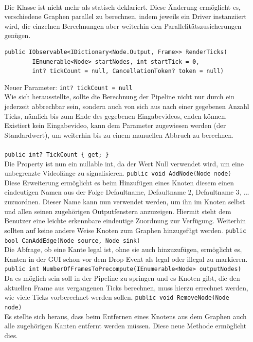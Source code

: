 \paragraph{}
\begin{itemize}
	\change Die Klasse ist nicht mehr als statisch deklariert. Diese Änderung ermöglicht es, verschiedene Graphen parallel zu berechnen, indem jeweils ein Driver instanziiert wird, die einzelnen Berechnungen aber weiterhin den Parallelitätszusicherungen genügen.
	\add \begin{verbatim}public IObservable<IDictionary<Node.Output, Frame>> RenderTicks(
	    IEnumerable<Node> startNodes, int startTick = 0,
	    int? tickCount = null, CancellationToken? token = null)
	\end{verbatim}
	Neuer Parameter: \verb!int? tickCount = null! \\ 
	Wie sich herausstellte, sollte die Berechnung der Pipeline nicht nur durch ein  jederzeit abbrechbar sein, sondern auch von sich aus nach einer gegebenen Anzahl Ticks, nämlich bis zum Ende des gegebenen Eingabevideos, enden können. Existiert kein Eingabevideo, kann dem Parameter  zugewiesen werden (der Standardwert), um weiterhin bis zu einem manuellen Abbruch zu berechnen.
\end{itemize}

\paragraph{}
\begin{itemize}
	\change \verb!public int? TickCount { get; }! \\
	Die Property ist nun ein nullable int, da der Wert Null verwendet wird, um eine unbegrenzte Videolänge zu signalisieren.
	\add \verb!public void AddNode(Node node)! \\
	Diese Erweiterung ermöglicht es beim Hinzufügen eines Knoten diesem einen eindeutigen Namen aus der Folge Defaultname, Defaultname 2, Defaultname 3, ... zuzuordnen. Dieser Name kann nun verwendet werden, um ihn im Knoten selbst und allen seinen zugehörigen Outputfenstern anzuzeigen. Hiermit steht dem Benutzer eine leichte erkennbare eindeutige Zuordnung zur Verfügung. Weiterhin sollten auf keine andere Weise Knoten zum Graphen hinzugefügt werden.
	\add \verb!public bool CanAddEdge(Node source, Node sink)! \\
	Die Abfrage, ob eine Kante legal ist, ohne sie auch hinzuzufügen, ermöglicht es, Kanten in der GUI schon vor dem Drop-Event als legal oder illegal zu markieren.
	\add \verb!public int NumberOfFramesToPrecompute(IEnumerable<Node> outputNodes)! \\
	Da es möglich sein soll in der Pipeline zu springen und es Knoten gibt, die den aktuellen Frame aus vergangenen Ticks berechnen, muss hierzu errechnet werden, wie viele Ticks vorberechnet werden sollen.
	\add \verb!public void RemoveNode(Node node)! \\
	Es stellte sich heraus, dass beim Entfernen eines Knotens aus dem Graphen auch alle zugehörigen Kanten entfernt werden müssen. Diese neue Methode ermöglicht dies.
\end{itemize}


